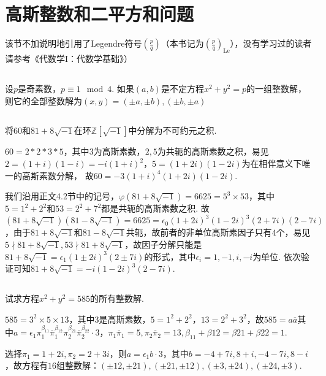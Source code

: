 \section{高斯整数和二平方和问题}
该节不加说明地引用了Legendre符号$\displaystyle\left(\frac{p}{q}\right)$（本书记为$\displaystyle\left(\frac{p}{q}\right)_{\mathrm{Le}}$），没有学习过的读者请参考《代数学I：代数学基础》）
\subsection{}
设$p$是奇素数，$p\equiv 1\mod 4$. 如果$(a,b)$是不定方程$x^2+y^2=p$的一组整数解，则它的全部整数解为$(x,y)=(\pm a,\pm b), (\pm b,\pm a)$


\subsection{}
将$60$和$81+8\sqrt{-1}$在环$\mathbb{Z}[\sqrt{-1}]$中分解为不可约元之积.

\jie
$60=2*2*3*5$，其中$3$为高斯素数，$2,5$为共轭的高斯素数之积，易见
$2=(1+i)(1-i)=-i(1+i)^2$，$5=(1+2i)(1-2i)$为在相伴意义下唯一的高斯素数分解，
故$60=-3(1+i)^4(1+2i)(1-2i)$.

我们沿用正文4.2节中的记号，$\varphi(81+8\sqrt{-1})=6625=5^3\times 53$，其中$5=1^2+2^2$和$53=2^2+7^2$都是共轭的高斯素数之积.
故$(81+8\sqrt{-1})(81-8\sqrt{-1})=6625=\epsilon_0(1+2i)^3(1-2i)^3(2+7i)(2-7i)$，由于$81+8\sqrt{-1}$和$81-8\sqrt{-1}$共轭，故前者的非单位高斯素因子只有$4$个，易见$5\nmid 81+8\sqrt{-1}, 53\nmid 81+8\sqrt{-1}$，故因子分解只能是$81+8\sqrt{-1}=\epsilon_1(1\pm 2i)^3(2\pm 7i)$的形式，其中$\epsilon_i=1,-1,i,-i$为单位. 依次验证可知$81+8\sqrt{-1}=-i(1-2i)^3(2-7i)$.

\subsection{}
试求方程$x^2+y^2=585$的所有整数解.

\jie $585=3^2\times 5\times 13$，其中$3$是高斯素数，$5=1^2+2^2$，$13=2^2+3^2$，故$585=a\overline{a}$其中$a=\epsilon_1\pi_1^{\beta_{11}}\overline{\pi}_1^{\beta_{12}}\pi_2^{\beta_{21}}\overline{\pi}_2^{\beta_{22}}\cdot 3$，$\pi_1\overline{\pi}_1=5, \pi_2\overline{\pi}_2=13, \beta_{11}+\beta{12}=\beta{21}+\beta{22}=1$.

选择$\pi_1=1+2i, \pi_2=2+3i$，则$a=\epsilon_1b\cdot 3$，其中$b=-4+7i, 8+i, -4-7i, 8-i$，故方程有$16$组整数解：$(\pm 12, \pm 21), (\pm 21, \pm 12), (\pm 3, \pm 24), (\pm 24, \pm 3)$.

